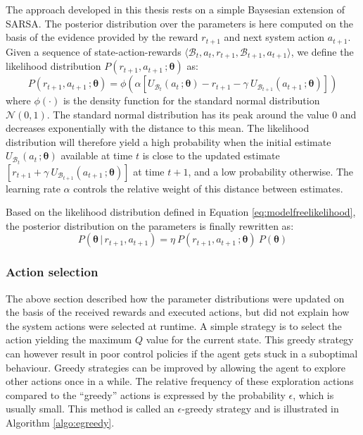 
The approach developed in this thesis rests on a simple Baysesian extension of SARSA.  The posterior distribution over the parameters is here computed on the basis of the evidence provided by the reward $r_{t+1}$ and next system action $a_{t+1}$.  Given a sequence of state-action-rewards $\langle \mathcal{B}_t, a_t, r_{t+1}, \mathcal{B}_{t+1}, a_{t+1} \rangle$, we define the likelihood distribution $P(r_{t+1}, a_{t+1} \,; \boldsymbol\theta)$ as:
\begin{equation}
P(r_{t+1}, a_{t+1} \,; \boldsymbol\theta) = \phi \left(\alpha \left[ U_{\mathcal{B}_t}\left(a_t \,; \boldsymbol\theta\right) - r_{t+1} - \gamma \ U_{\mathcal{B}_{t+1}} \left(a_{t+1} \,; \boldsymbol\theta\right) \right] \right) \label{eq:modelfreelikelihood}
\end{equation}
where $\phi(\cdot)$ is the density function for the standard normal distribution $\mathcal{N}(0, 1)$. The standard normal distribution has its peak around the value 0 and decreases exponentially with the distance to this mean. The likelihood distribution will therefore yield a high probability when the initial estimate 
$U_{\mathcal{B}_t}(a_t \,; \boldsymbol\theta)$ available at time $t$ is close to the updated estimate $\left[r_{t+1} + \gamma \ U_{\mathcal{B}_{t+1}} (a_{t+1} \,; \boldsymbol\theta) \right]$ at time $t+1$, and a low probability otherwise. The learning rate $\alpha$ controls the relative weight of this distance between estimates. 

Based on the likelihood distribution defined in Equation \eqref{eq:modelfreelikelihood}, the posterior distribution on the parameters is finally rewritten as: 
\begin{equation}
P(\boldsymbol\theta \, | \, r_{t+1}, a_{t+1}) = \eta \ P(r_{t+1}, a_{t+1} \,; \boldsymbol\theta)  \ P(\boldsymbol\theta)  \label{eq:posteriormodelfree}
\end{equation}


\subsubsection*{Action selection}

The above section described how the parameter distributions were updated on the basis of the received rewards and executed actions, but did not explain how the system actions were selected at runtime.  A simple strategy is to select the action yielding the maximum $Q$ value for the current state.  This greedy strategy can however result in poor control policies if the agent gets stuck in a suboptimal behaviour.  Greedy strategies can be improved by allowing the agent to explore other actions once in a while. The relative frequency of these exploration actions compared to the  ``greedy'' actions is expressed by the probability $\epsilon$, which is usually small. This method is called an $\epsilon$-greedy strategy and is illustrated in Algorithm \ref{algo:egreedy}.

